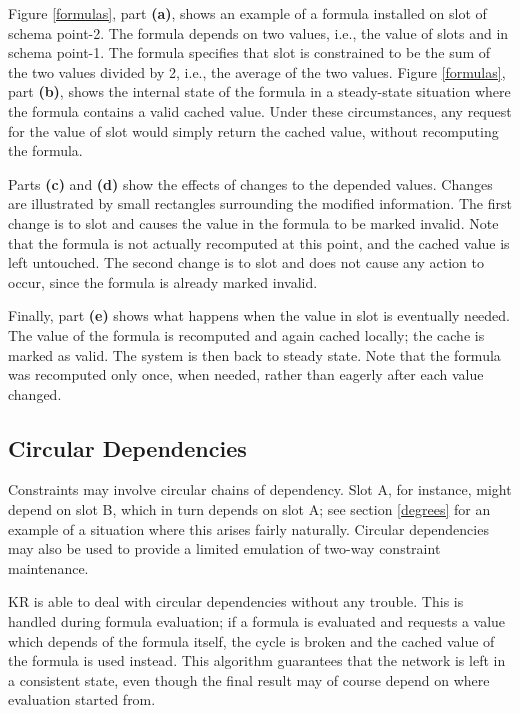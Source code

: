 Figure \ref{formulas}, part {\bf (a)}, shows an example of a formula
installed on slot  of schema {\sc point-2}.  The formula depends on
two values, i.e., the value of slots  and  in schema
{\sc point-1}.  The formula specifies that slot  is constrained to be
the sum of the two values divided by 2, i.e., the average of the two
values.  Figure \ref{formulas}, part {\bf (b)}, shows the internal state of
the formula in a steady-state situation where the formula contains a valid
cached value.  Under these circumstances, any request for the value of slot
 would simply return the cached value, without recomputing the
formula.

Parts {\bf (c)} and {\bf (d)} show the effects of changes to the depended
values.  Changes are illustrated by small
rectangles surrounding the modified information.  The first change is to
slot  and causes the value in the formula to be marked invalid.
Note that the formula is not actually recomputed at this point, and the
cached value is left untouched.  The second change is to slot  and
does not cause any action to occur, since the formula is already marked
invalid.

Finally, part {\bf (e)} shows what happens when the value in slot  is
eventually needed.  The value of the formula is recomputed and again cached
locally; the cache is marked as valid.  The system is then back to steady
state.  Note that the formula was recomputed only once, when needed, rather
than eagerly after each value changed.



\subsection{Circular Dependencies}

Constraints may involve circular chains of
dependency.  Slot A, for instance, might depend on slot B, which in turn
depends on slot A; see section \ref{degrees} for an example of a situation
where this arises fairly naturally.  Circular dependencies may also be used to
provide a limited emulation of two-way constraint maintenance.

KR is able to deal with circular dependencies without any trouble.  This is
handled during formula evaluation; if a formula is evaluated and requests a
value which depends of the formula itself, the cycle is broken and the
cached value of the formula is used instead.  This algorithm guarantees
that the network is left in a consistent state, even though the final
result may of course depend on where evaluation started from.



